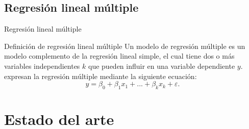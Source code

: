 \documentclass[11pt]{beamer}
\begin{document}
\subsection{Regresión lineal múltiple}
\begin{frame}{Regresión lineal múltiple}
\begin{block}{Definición de regresión lineal múltiple} \justifying
Un modelo de regresión múltiple es un modelo complemento de la regresión lineal simple, el cual tiene dos o más variables independientes $k$ que pueden influir en una variable dependiente $y$. \citet{r11} expresan la regresión múltiple mediante la siguiente ecuación:
\begin{equation}
    y = \beta_0 + \beta_1x_1 + ... + \beta_kx_k + \varepsilon.
    \label{eq2}
\end{equation}
\end{block}
\end{frame}


\section{Estado del arte}
\end{document}
